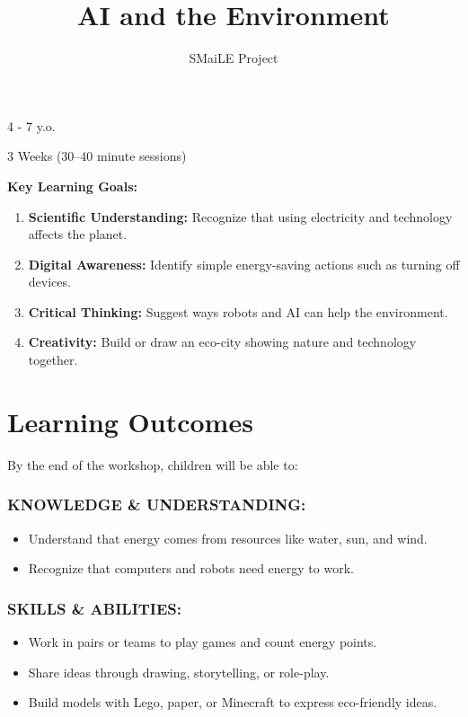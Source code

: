 \documentclass[11pt, a4paper]{article}
\begin{document}
\title{\textbf{\color{SmaileGreen}AI and the Environment}}
\author{SMaiLE Project}
\date{}
\maketitle
\thispagestyle{plain}

\begin{keyinfobox}
    \begin{description}[leftmargin=*, labelindent=0pt]
        \item[\bfseries\color{SmaileGreen} Target Group:] 4 - 7 y.o.
        \item[\bfseries\color{SmaileGreen} Duration:] 3 Weeks (30--40 minute sessions)
    \end{description}
    \textbf{Key Learning Goals:}
    \begin{enumerate}
        \item \textbf{Scientific Understanding:} Recognize that using electricity and technology affects the planet.
        \item \textbf{Digital Awareness:} Identify simple energy-saving actions such as turning off devices.
        \item \textbf{Critical Thinking:} Suggest ways robots and AI can help the environment.
        \item \textbf{Creativity:} Build or draw an eco-city showing nature and technology together.
    \end{enumerate}
\end{keyinfobox}

\section*{Learning Outcomes}
By the end of the workshop, children will be able to:

\subsubsection*{KNOWLEDGE \& UNDERSTANDING:}
\begin{itemize}
    \item Understand that energy comes from resources like water, sun, and wind.
    \item Recognize that computers and robots need energy to work.
\end{itemize}

\subsubsection*{SKILLS \& ABILITIES:}
\begin{itemize}
    \item Work in pairs or teams to play games and count energy points.
    \item Share ideas through drawing, storytelling, or role-play.
    \item Build models with Lego, paper, or Minecraft to express eco-friendly ideas.
\end{itemize}
\end{document}
